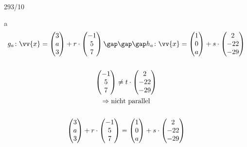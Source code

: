 \begin{exercise}{293/10}
  \item [a]
  \begin{gather*}
    g_a \colon \vv{x} = \begin{pmatrix}3 \\ a \\ 3\end{pmatrix} + r \cdot \begin{pmatrix}-1 \\ 5 \\ 7\end{pmatrix} \gap\gap\gap h_a \colon \vv{x} = \begin{pmatrix}1 \\ 0 \\ a\end{pmatrix} + s \cdot \begin{pmatrix}2 \\ -22 \\ -29\end{pmatrix} \\\\
    \begin{pmatrix}-1 \\ 5 \\ 7\end{pmatrix} \neq t \cdot \begin{pmatrix}2 \\ -22 \\ -29\end{pmatrix} \\
    \Rightarrow \text{nicht parallel} \\\\
    \begin{pmatrix}3 \\ a \\ 3\end{pmatrix} + r \cdot \begin{pmatrix}-1 \\ 5 \\ 7\end{pmatrix} = \begin{pmatrix}1 \\ 0 \\ a\end{pmatrix} + s \cdot \begin{pmatrix}2 \\ -22 \\ -29\end{pmatrix} \\

\end{gather*}
\end{exercise}
